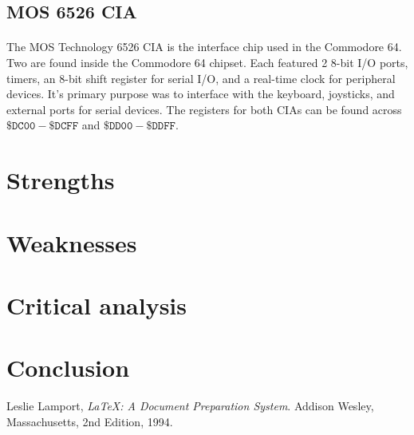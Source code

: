 \documentclass{article}
\begin{document}
\subsection{MOS 6526 CIA}
\paragraph{}
The MOS Technology 6526 CIA is the interface chip used in the Commodore 64. Two are found inside the Commodore 64 chipset. Each featured 2 8-bit I/O ports, timers, an 8-bit shift register for serial I/O, and a real-time clock for peripheral devices. It's primary purpose was to interface with the keyboard, joysticks, and external ports for serial devices. The registers for both CIAs can be found across $\mathtt{\$DC00 - \$DCFF}$ and $\mathtt{\$DD00 - \$DDFF}$.

\section{Strengths}

\section{Weaknesses}

\section{Critical analysis}

\section{Conclusion}

\pagebreak

\begin{thebibliography}{9}

  Leslie Lamport,
  \emph{\LaTeX: A Document Preparation System}.
  Addison Wesley, Massachusetts,
  2nd Edition,
  1994.

\end{thebibliography}
\end{document}
